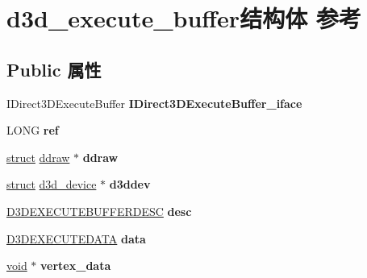 \hypertarget{structd3d__execute__buffer}{}\section{d3d\+\_\+execute\+\_\+buffer结构体 参考}
\label{structd3d__execute__buffer}
\subsection*{Public 属性}
\begin{DoxyCompactItemize}
\item 
\mbox{\label{structd3d__execute__buffer_a0f7fd1b9b56316574091ecd07edf460f}} 
I\+Direct3\+D\+Execute\+Buffer {\bfseries I\+Direct3\+D\+Execute\+Buffer\+\_\+iface}
\item 
\mbox{\label{structd3d__execute__buffer_a088f3ea751d2fa5b2668a50f331daed3}} 
L\+O\+NG {\bfseries ref}
\item 
\mbox{\label{structd3d__execute__buffer_a8af42b8318e64cf42d5bf40795aa9c19}} 
\hyperlink{interfacestruct}{struct} \hyperlink{structddraw}{ddraw} $\ast$ {\bfseries ddraw}
\item 
\mbox{\label{structd3d__execute__buffer_acce8ebc07b4dc772f03a1092a855ed5b}} 
\hyperlink{interfacestruct}{struct} \hyperlink{structd3d__device}{d3d\+\_\+device} $\ast$ {\bfseries d3ddev}
\item 
\mbox{\label{structd3d__execute__buffer_a44be17ff2781db2f0d467f4e65e941cf}} 
\hyperlink{struct___d3_d_execute_buffer_desc}{D3\+D\+E\+X\+E\+C\+U\+T\+E\+B\+U\+F\+F\+E\+R\+D\+E\+SC} {\bfseries desc}
\item 
\mbox{\label{structd3d__execute__buffer_acf265a32b50b2e10bdb3c2eff5aea07e}} 
\hyperlink{struct___d3_d_e_x_e_c_u_t_e_d_a_t_a}{D3\+D\+E\+X\+E\+C\+U\+T\+E\+D\+A\+TA} {\bfseries data}
\item 
\mbox{\label{structd3d__execute__buffer_a2adaa0202a8b40ed231c56d3d041f1f2}} 
\hyperlink{interfacevoid}{void} $\ast$ {\bfseries vertex\+\_\+data}
\item 

\end{DoxyCompactItemize}
